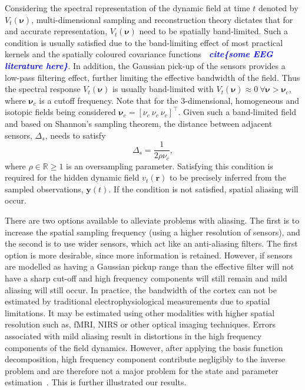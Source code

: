 \documentclass[12pt]{iopart}		%
\newcommand{\todo}[1]{\textsf{\emph{\textbf{\textcolor{blue}{#1}}}}}
\begin{document}
Considering the spectral representation of the dynamic field at time $t$ denoted by $V_t(\boldsymbol{\nu})$, multi-dimensional sampling and reconstruction theory dictates that for and accurate representation, $V_t(\boldsymbol{\nu})$ need to be spatially band-limited. Such a condition is usually satisfied due to the band-limiting effect of most practical kernels and the spatially coloured covariance functions \todo{~cite\{some EEG literature here\}}. In addition, the Gaussian pick-up of the sensors provides a low-pass filtering effect, further limiting the effective bandwidth of the field. Thus the spectral response $V_t(\boldsymbol{\nu})$ is usually band-limited with $V_t(\boldsymbol{\nu}) \approx 0 ~ \forall \boldsymbol{\nu} > \boldsymbol{\nu}_c$, where $\boldsymbol{\nu}_c$ is a cutoff frequency. Note that for the 3-dimensional, homogeneous and isotopic fields being considered $\boldsymbol{\nu}_c = [\nu_c ~ \nu_c ~ \nu_c]^\top$. Given such a band-limited field and based on Shannon's sampling theorem, the distance between adjacent sensors, $\Delta_s$, needs to satisfy
\begin{equation}
\Delta_s = \frac{1}{2\rho\nu_c},
\end{equation}
where $\rho \in \mathbb{R} \ge 1$ is an oversampling parameter. Satisfying this condition is required for the hidden dynamic field $v_t(\mathbf{r})$ to be precisely inferred from the sampled observations, $\mathbf{y}(t)$. If the condition is not satisfied, spatial aliasing will occur.

There are two options available to alleviate problems with aliasing. The first is to increase the spatial sampling frequency (using a higher resolution of sensors), and the second is to use wider sensors, which act like an anti-aliasing filters. The first option is more desirable, since more information is retained. However, if sensors are modelled as having a Gaussian pickup range than the effective filter will not have a sharp cut-off and high frequency components will still remain and mild aliasing will still occur. In practice, the bandwidth of the cortex can not be estimated by traditional electrophysiological measurements due to spatial limitations. It may be estimated using other modalities with higher spatial resolution such as, fMRI, NIRS or other optical imaging techniques. Errors associated with mild aliasing result in distortions in the high frequency components of the field dynamics. However, after applying the basis function decomposition, high frequency component contribute negligibly to the inverse problem and are therefore not a major problem for the state and parameter estimation~\cite{Sanner1992}. This is further illustrated our results.
\end{document}
